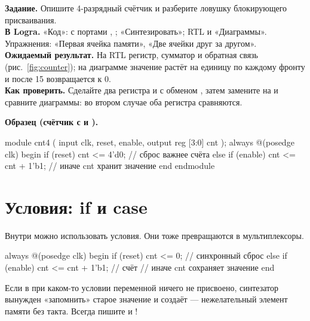 \begin{diybox}
\textbf{Задание.} Опишите 4-разрядный счётчик и разберите ловушку блокирующего присваивания.\\
\textbf{В Logra.} «Код»:  с портами , ; «Синтезировать»; RTL и «Диаграммы». Упражнения: «Первая ячейка памяти», «Две ячейки друг за другом».\\
\textbf{Ожидаемый результат.} На RTL регистр, сумматор и обратная связь (рис.~\ref{fig:counter}); на диаграмме значение растёт на единицу по каждому фронту и после 15 возвращается к 0.\\
\textbf{Как проверить.}  Сделайте два регистра  и  с обменом , затем замените \code{<=} на \code{=} и сравните диаграммы: во втором случае оба регистра сравняются.
\end{diybox}

\textbf{Образец (счётчик с  и ).}\par\nopagebreak
\begin{vcode}
module cnt4 (
    input            clk, reset, enable,
    output reg [3:0] cnt
);
    always @(posedge clk) begin
        if (reset)       cnt <= 4'd0;         // сброс важнее счёта
        else if (enable) cnt <= cnt + 1'b1;   // иначе cnt хранит значение
    end
endmodule
\end{vcode}


\section{Условия: if и case}

Внутри  можно использовать условия. Они тоже превращаются в
мультиплексоры.
\begin{vcode}
always @(posedge clk) begin
    if (reset)
        cnt <= 0;               // синхронный сброс
    else if (enable)
        cnt <= cnt + 1'b1;      // счёт
    // иначе cnt сохраняет значение
end
\end{vcode}

\begin{warnbox}
Если в  при каком-то условии переменной ничего не присвоено,
синтезатор вынужден «запомнить» старое значение и создаёт  ---
нежелательный элемент памяти без такта. Всегда пишите  и
!
\end{warnbox}

